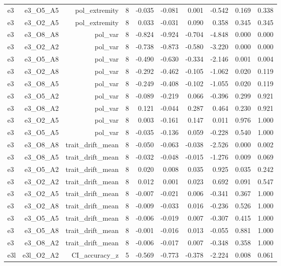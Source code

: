 \documentclass[11pt]{article}
\begin{document}
\begin{landscape}
\begin{longtable}{@{}lrrrrrrrrr@{}}
e3 & e3\_O5\_A5 & pol\_extremity & 8 & -0.035 & -0.081 & 0.001 & -0.542 & 0.169 & 0.338 \\
e3 & e3\_O2\_A5 & pol\_extremity & 8 & 0.033 & -0.031 & 0.090 & 0.358 & 0.345 & 0.345 \\
e3 & e3\_O8\_A8 & pol\_var & 8 & -0.824 & -0.924 & -0.704 & -4.848 & 0.000 & 0.000 \\
e3 & e3\_O2\_A2 & pol\_var & 8 & -0.738 & -0.873 & -0.580 & -3.220 & 0.000 & 0.000 \\
e3 & e3\_O5\_A8 & pol\_var & 8 & -0.490 & -0.630 & -0.334 & -2.146 & 0.001 & 0.004 \\
e3 & e3\_O2\_A8 & pol\_var & 8 & -0.292 & -0.462 & -0.105 & -1.062 & 0.020 & 0.119 \\
e3 & e3\_O8\_A5 & pol\_var & 8 & -0.249 & -0.408 & -0.102 & -1.055 & 0.020 & 0.119 \\
e3 & e3\_O5\_A2 & pol\_var & 8 & -0.089 & -0.219 & 0.066 & -0.396 & 0.299 & 0.921 \\
e3 & e3\_O8\_A2 & pol\_var & 8 & 0.121 & -0.044 & 0.287 & 0.464 & 0.230 & 0.921 \\
e3 & e3\_O2\_A5 & pol\_var & 8 & 0.003 & -0.161 & 0.147 & 0.011 & 0.976 & 1.000 \\
e3 & e3\_O5\_A5 & pol\_var & 8 & -0.035 & -0.136 & 0.059 & -0.228 & 0.540 & 1.000 \\
e3 & e3\_O8\_A8 & trait\_drift\_mean & 8 & -0.050 & -0.063 & -0.038 & -2.526 & 0.000 & 0.002 \\
e3 & e3\_O8\_A5 & trait\_drift\_mean & 8 & -0.032 & -0.048 & -0.015 & -1.276 & 0.009 & 0.069 \\
e3 & e3\_O5\_A2 & trait\_drift\_mean & 8 & 0.020 & 0.008 & 0.035 & 0.925 & 0.035 & 0.242 \\
e3 & e3\_O2\_A2 & trait\_drift\_mean & 8 & 0.012 & 0.001 & 0.023 & 0.692 & 0.091 & 0.547 \\
e3 & e3\_O2\_A5 & trait\_drift\_mean & 8 & -0.007 & -0.021 & 0.006 & -0.341 & 0.367 & 1.000 \\
e3 & e3\_O2\_A8 & trait\_drift\_mean & 8 & -0.009 & -0.033 & 0.016 & -0.236 & 0.526 & 1.000 \\
e3 & e3\_O5\_A5 & trait\_drift\_mean & 8 & -0.006 & -0.019 & 0.007 & -0.307 & 0.415 & 1.000 \\
e3 & e3\_O5\_A8 & trait\_drift\_mean & 8 & -0.001 & -0.016 & 0.013 & -0.055 & 0.881 & 1.000 \\
e3 & e3\_O8\_A2 & trait\_drift\_mean & 8 & -0.006 & -0.017 & 0.007 & -0.348 & 0.358 & 1.000 \\
e3l & e3l\_O2\_A2 & CI\_accuracy\_z & 5 & -0.569 & -0.773 & -0.378 & -2.224 & 0.008 & 0.061 \\

\end{longtable}
\end{landscape}
\end{document}
